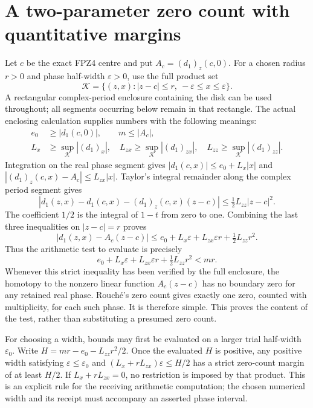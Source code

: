 \documentclass[11pt]{article}
\begin{document}
\section{A two-parameter zero count with quantitative margins}
Let $c$ be the exact FPZ4 centre and put $A_c=(d_1)_z(c,0)$.
For a chosen radius $r>0$ and phase half-width $\varepsilon>0$,
use the full product set
\[
 \mathcal K=\{(z,x):|z-c|\le r,\ -\varepsilon\le x\le\varepsilon\}.
 \tag{OPD15}
\]
A rectangular complex-period enclosure containing the disk can be
used throughout; all segments occurring below remain in that rectangle.
The actual enclosing calculation supplies numbers with the following
meanings:
\[
 \begin{split}
 e_0&\ge|d_1(c,0)|,\qquad m\le|A_c|,\\
 L_x&\ge\sup_{\mathcal K}|(d_1)_x|,\quad
 L_{zx}\ge\sup_{\mathcal K}|(d_1)_{zx}|,\quad
 L_{zz}\ge\sup_{\mathcal K}|(d_1)_{zz}|.
 \end{split}\tag{OPD16}
\]
Integration on the real phase segment gives
$|d_1(c,x)|\le e_0+L_x|x|$ and
$|(d_1)_z(c,x)-A_c|\le L_{zx}|x|$.
Taylor's integral remainder along the complex period segment gives
\[
 |d_1(z,x)-d_1(c,x)-(d_1)_z(c,x)(z-c)|
 \le \tfrac12L_{zz}|z-c|^2.
 \tag{OPD17}
\]
The coefficient $1/2$ is the integral of $1-t$ from zero to one.
Combining the last three inequalities on $|z-c|=r$ proves
\[
 |d_1(z,x)-A_c(z-c)|
 \le e_0+L_x\varepsilon+L_{zx}\varepsilon r
                  +\tfrac12L_{zz}r^2.
 \tag{OPD18}
\]
Thus the arithmetic test to evaluate is precisely
\[
 e_0+L_x\varepsilon+L_{zx}\varepsilon r+\tfrac12L_{zz}r^2<mr.
 \tag{OPD19}
\]
Whenever this strict inequality has been verified by the full
enclosure, the homotopy to the nonzero linear function $A_c(z-c)$
has no boundary zero for any retained real phase. Rouch\'e's
zero count gives exactly one zero, counted with multiplicity, for
each such phase. It is therefore simple. This proves the content
of the test, rather than substituting a presumed zero count.

For choosing a width, bounds may first be evaluated on a larger
trial half-width $\varepsilon_0$. Write
$H=mr-e_0-L_{zz}r^2/2$. Once the evaluated $H$ is positive,
any positive width satisfying
$\varepsilon\le\varepsilon_0$ and
$(L_x+rL_{zx})\varepsilon\le H/2$ has a strict zero-count margin
of at least $H/2$. If $L_x+rL_{zx}=0$, no restriction is imposed
by that product. This is an explicit rule for the receiving
arithmetic computation; the chosen numerical width and its
receipt must accompany an asserted phase interval.
\end{document}
